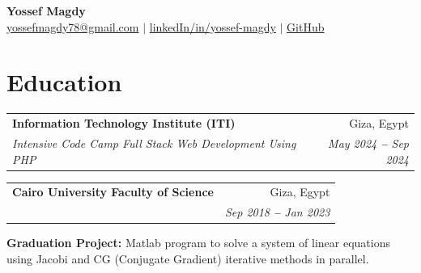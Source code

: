 \documentclass[a4paper,12pt]{article}
\makeatletter
\newcommand{\resumeSubheading}[4]{
  \vspace{-2pt}\item
    \begin{tabular*}{0.97\textwidth}[t]{l@{\extracolsep{\fill}}r}
      \textbf{#1} & #2 \\
      \textit{\small#3} & \textit{\small #4} \\
    \end{tabular*}\vspace{-7pt}
}
\newcommand{\resumeSubHeadingListStart}{\begin{itemize}[leftmargin=0.15in, label={}]}
\newcommand{\resumeSubHeadingListEnd}{\end{itemize}}
\makeatother
\begin{document}

\begin{center}
    \textbf{\Huge Yossef Magdy} \\ \vspace{3pt}
    \small
	\faEnvelope \hspace{.5pt} \href{mailto:yossefmagdy78@gmail.com}{yossefmagdy78@gmail.com}
   	$|$
	\faLinkedinSquare \hspace{.5pt} \href{https://www.linkedin.com/in/yossef-magdy}{linkedIn/in/yossef-magdy}
    $|$
    \faGithub \hspace{.5pt} \href{https://github.com/yossef-magdy}{GitHub}
    
\end{center}




\section{Education}
  \vspace{3pt}
  \resumeSubHeadingListStart
    
    \resumeSubheading
	{Information Technology Institute (ITI)}{Giza, Egypt}
	{Intensive Code Camp Full Stack Web Development Using PHP }{May 2024 \textbf{--} Sep 2024}
    
    \resumeSubheading
    {Cairo University Faculty of Science}{Giza, Egypt}
    {B.Sc. in Computer Science   \textbf}{Sep 2018 \textbf{--} Jan 2023}
    \resumeSubHeadingListStart
    \small{
    	\item{
    	\textbf{Graduation Project:}
    		Matlab program to solve a system of linear equations using Jacobi and CG (Conjugate Gradient) iterative methods in parallel.
      	}
    }
    \resumeSubHeadingListEnd

    
  \resumeSubHeadingListEnd



\end{document}
